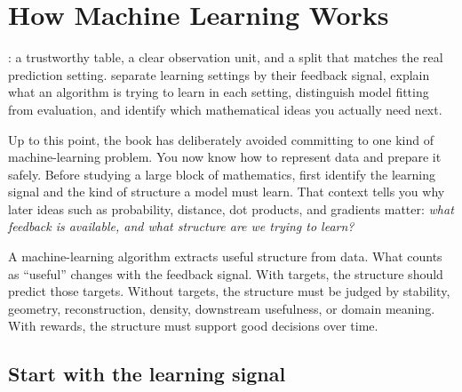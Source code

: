 \chapter{How Machine Learning Works}
\label{ch:learning}

\chapterguide%
  {: a trustworthy table, a clear observation unit, and a split that matches the real prediction setting.}
  {separate learning settings by their feedback signal, explain what an algorithm is trying to learn in each setting, distinguish model fitting from evaluation, and identify which mathematical ideas you actually need next.}

Up to this point, the book has deliberately avoided committing to one kind of machine-learning problem. You now know how to represent data and prepare it safely. Before studying a large block of mathematics, first identify the learning signal and the kind of structure a model must learn. That context tells you why later ideas such as probability, distance, dot products, and gradients matter: \emph{what feedback is available, and what structure are we trying to learn?}

\begin{keyidea}
A machine-learning algorithm extracts useful structure from data. What counts as ``useful'' changes with the feedback signal. With targets, the structure should predict those targets. Without targets, the structure must be judged by stability, geometry, reconstruction, density, downstream usefulness, or domain meaning. With rewards, the structure must support good decisions over time.
\end{keyidea}

\section{Start with the learning signal}

